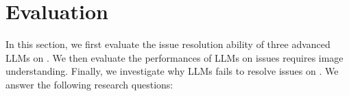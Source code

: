 










\secmargin
\section{Evaluation}

In this section, we first evaluate the issue resolution ability of three advanced LLMs on \Swebenchx. We then  evaluate the performances of LLMs on issues requires image understanding. Finally, we investigate why LLMs fails to resolve issues on \Swebenchx. %
We answer the following research questions: 





